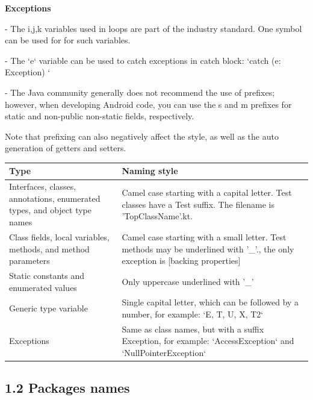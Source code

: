 \textbf{Exceptions}

- The i,j,k variables used in loops are part of the industry standard. One symbol can be used for for such variables.

- The `e` variable can be used to catch exceptions in catch block: `catch (e: Exception) {}`

- The Java community generally does not recommend the use of prefixes; however, when developing Android code, you can use the s and m prefixes for static and non-public non-static fields, respectively.

Note that prefixing can also negatively affect the style, as well as the auto generation of getters and setters.



\begin{center}

\begin{tabular}{ |p{}|p{}| }

\hline

Type&Naming style\\

\hline

 Interfaces, classes, annotations, enumerated types, and object type names & Camel case starting with a capital letter. Test classes have a Test suffix. The filename is 'TopClassName'.kt.  \\

 Class fields, local variables, methods, and method parameters & Camel case starting with a small letter. Test methods may be underlined with '\_'., the only exception is [backing properties] \\

 Static constants and enumerated values & Only uppercase underlined with '\_' \\

 Generic type variable & Single capital letter, which can be followed by a number, for example: `E, T, U, X, T2` \\

 Exceptions & Same as class names, but with a suffix Exception, for example: `AccessException` and `NullPointerException`\\

\hline

\end{tabular}

\end{center}

\subsection*{\textbf{1.2 Packages names}}

